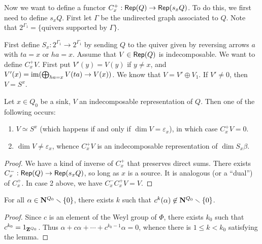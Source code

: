 \documentclass{article}
\begin{document}
Now we want to define a functor $C_x^+:\operatorname{\mathsf{Rep}}(Q) \to \operatorname{\mathsf{Rep}}(s_x Q)$. 
To do this, we first need to define $s_x Q$. First let $\Gamma$ be the undirected 
graph associated to $Q$. Note that 
$2^{\Gamma_1}=\{\text{quivers supported by }\Gamma\}$. 

First define \(S_x:2^{\Gamma_1} \to 2^{\Gamma_1}\) by sending \(Q\) to the quiver 
given by reversing arrows \(a\) with \(t a=x\) or \(h a=x\). 
Assume that \(V\in \operatorname{\mathsf{Rep}}(Q)\) is indecomposable. We want to define 
\(C_x^+ V\). First put \(V'(y)=V(y)\) if \(y\ne x\), and 
\(V'(x) = \operatorname{im}(\bigoplus_{h a=x} V(t a) \to V(x))\). We know that 
\(V=V'\oplus V_1\). If \(V'\ne 0\), then \(V=S^x\). 

\begin{theorem}
Let \(x\in Q_0\) be a sink, \(V\) an indecomposable representation of \(Q\). 
Then one of the following occurs:
\begin{enumerate}
  \item \(V\simeq S^x\) (which happens if and only if \(\dim V=\varepsilon_x\)), in which 
    case \(C_x^+ V=0\). 
  \item \(\dim V\ne \varepsilon_x\), whence \(C_x^+ V\) is an indecomposable 
    representation of \(\dim S_x\beta\). 
\end{enumerate}
\end{theorem}
\begin{proof}
We have a kind of inverse of \(C_x^+\) that preserves direct sums. There exists 
\(C_x^-:\operatorname{\mathsf{Rep}}(Q) \to \operatorname{\mathsf{Rep}}(s_xQ)\), so long as \(x\) is a 
source. It is analogous (or a ``dual'') of \(C_x^+\). In case 2 above, we have 
\(C_x^- C_x^+ V = V\). 
\end{proof}

\begin{lemma}\label{lem:tech-dynkin}
For all \(\alpha\in \mathbf{N}^{Q_0}\smallsetminus \{0\}\), there exists $k$ such that 
\(c^k(\alpha)\not\in \mathbf{N}^{Q_0}\smallsetminus \{0\}\). 
\end{lemma}
\begin{proof}
Since \(c\) is an element of the Weyl group of \(\Phi\), there exists 
\(k_0\) such that \(c^{k_0} = 1_{\mathbf{Z}^{Q_0}}\). 
Thus \(\alpha+c \alpha+ \cdots + c^{k_0-1}\alpha = 0 \), whence there is 
\(1\leqslant k<k_0\) satisfying the lemma. 
\end{proof}
\end{document}
